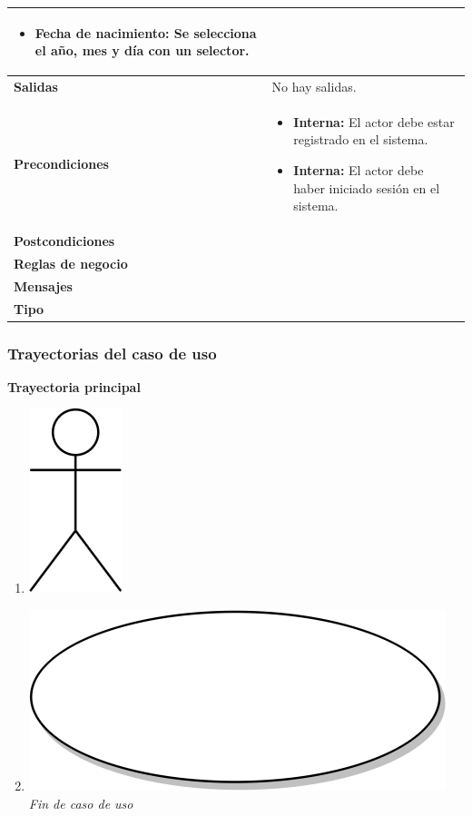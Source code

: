 \begin{center}
\begin{longtable}{| p{3.5cm} | p{11.5cm} |}
\begin{itemize}
              \item \textbf{Fecha de nacimiento}: Se selecciona el año, mes y día con un selector.
            \end{itemize} \\
        \hline  
          \textbf{Salidas} &  No hay salidas. \\
        \hline  
          \textbf{Precondiciones} & 
	 \begin{itemize}
	    \item \textbf{Interna:} El actor debe estar registrado en el sistema.
               \item \textbf{Interna:} El actor debe haber iniciado sesión en el sistema.
	 \end{itemize} \\
        \hline  
          \textbf{Postcondiciones} & \\
        \hline
          \textbf{Reglas de negocio} & \\
        \hline
          \textbf{Mensajes} & \\
        \hline
          \textbf{Tipo} & \\
        \hline      
  \end{longtable}
\end{center}
\endgroup

\subsubsection{Trayectorias del caso de uso}
\textbf{Trayectoria principal}
\begin{enumerate}
  \item {\includegraphics[scale=.1]{Capitulo3/img/actor.png} }
  \item {\includegraphics[scale=.05]{Capitulo3/img/proceso.png}}
  \textit{Fin de caso de uso} \\  
\end{enumerate}


